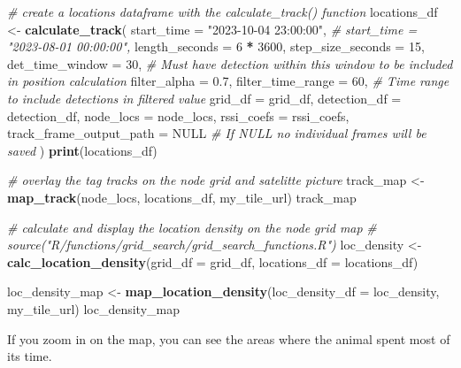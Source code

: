 \documentclass[
]{book}
\newenvironment{Shaded}{\begin{snugshade}}{\end{snugshade}}
\newcommand{\AttributeTok}[1]{\textcolor[rgb]{0.13,0.29,0.53}{#1}}
\newcommand{\CommentTok}[1]{\textcolor[rgb]{0.56,0.35,0.01}{\textit{#1}}}
\newcommand{\ConstantTok}[1]{\textcolor[rgb]{0.56,0.35,0.01}{#1}}
\newcommand{\DecValTok}[1]{\textcolor[rgb]{0.00,0.00,0.81}{#1}}
\newcommand{\FloatTok}[1]{\textcolor[rgb]{0.00,0.00,0.81}{#1}}
\newcommand{\FunctionTok}[1]{\textcolor[rgb]{0.13,0.29,0.53}{\textbf{#1}}}
\newcommand{\NormalTok}[1]{#1}
\newcommand{\OtherTok}[1]{\textcolor[rgb]{0.56,0.35,0.01}{#1}}
\newcommand{\SpecialCharTok}[1]{\textcolor[rgb]{0.81,0.36,0.00}{\textbf{#1}}}
\newcommand{\StringTok}[1]{\textcolor[rgb]{0.31,0.60,0.02}{#1}}
\begin{document}
\begin{Shaded}
\begin{Highlighting}[]
\CommentTok{\# create a locations dataframe with the calculate\_track() function}
\NormalTok{locations\_df }\OtherTok{\textless{}{-}} \FunctionTok{calculate\_track}\NormalTok{(}
  \AttributeTok{start\_time =} \StringTok{"2023{-}10{-}04 23:00:00"}\NormalTok{,}
  \CommentTok{\# start\_time = "2023{-}08{-}01 00:00:00",}
  \AttributeTok{length\_seconds =} \DecValTok{6} \SpecialCharTok{*} \DecValTok{3600}\NormalTok{,}
  \AttributeTok{step\_size\_seconds =} \DecValTok{15}\NormalTok{,}
  \AttributeTok{det\_time\_window =} \DecValTok{30}\NormalTok{, }\CommentTok{\# Must have detection within this window to be included in position calculation}
  \AttributeTok{filter\_alpha =} \FloatTok{0.7}\NormalTok{,}
  \AttributeTok{filter\_time\_range =} \DecValTok{60}\NormalTok{, }\CommentTok{\# Time range to include detections in filtered value}
  \AttributeTok{grid\_df =}\NormalTok{ grid\_df,}
  \AttributeTok{detection\_df =}\NormalTok{ detection\_df,}
  \AttributeTok{node\_locs =}\NormalTok{ node\_locs,}
  \AttributeTok{rssi\_coefs =}\NormalTok{ rssi\_coefs,}
  \AttributeTok{track\_frame\_output\_path =} \ConstantTok{NULL} \CommentTok{\# If NULL no individual frames will be saved}
\NormalTok{)}
\FunctionTok{print}\NormalTok{(locations\_df)}

\CommentTok{\# overlay the tag tracks on the node grid and satelitte picture}
\NormalTok{track\_map }\OtherTok{\textless{}{-}} \FunctionTok{map\_track}\NormalTok{(node\_locs, }
\NormalTok{                       locations\_df, }
\NormalTok{                       my\_tile\_url)}
\NormalTok{track\_map}

\CommentTok{\# calculate and display the location density on the node grid map}
\CommentTok{\# source("R/functions/grid\_search/grid\_search\_functions.R")}
\NormalTok{loc\_density }\OtherTok{\textless{}{-}} \FunctionTok{calc\_location\_density}\NormalTok{(}\AttributeTok{grid\_df =}\NormalTok{ grid\_df, }
                                     \AttributeTok{locations\_df =}\NormalTok{ locations\_df)}

\NormalTok{loc\_density\_map }\OtherTok{\textless{}{-}} \FunctionTok{map\_location\_density}\NormalTok{(}\AttributeTok{loc\_density\_df =}\NormalTok{ loc\_density, my\_tile\_url)}
\NormalTok{loc\_density\_map}
\end{Highlighting}
\end{Shaded}

If you zoom in on the map, you can see the areas where the animal spent most of its time.
\end{document}
